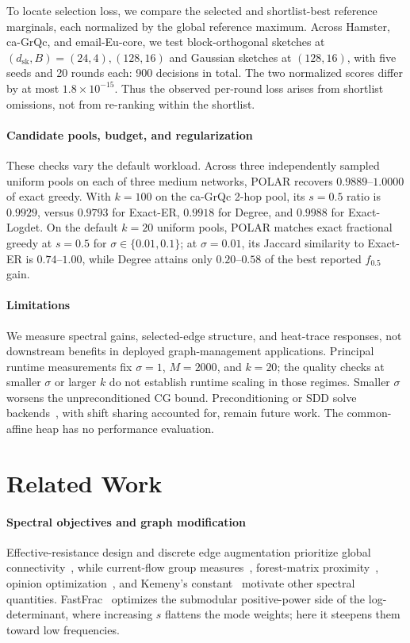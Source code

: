 \documentclass[conference]{IEEEtran}
\theoremstyle{definition}
\newcommand{\POLAR}{\textsc{POLAR}}
\newcommand{\dsk}{d_{\mathrm{sk}}}
\begin{document}
To locate selection loss, we compare the selected and shortlist-best
reference marginals, each normalized by the global reference maximum.
Across Hamster, ca-GrQc, and email-Eu-core, we test block-orthogonal
sketches at $(\dsk,B)=(24,4),(128,16)$ and Gaussian sketches at
$(128,16)$, with five seeds and 20 rounds each: 900 decisions in total.
The two normalized scores differ by at most $1.8\times10^{-15}$.
Thus the observed per-round loss arises from shortlist omissions, not
from re-ranking within the shortlist.

\paragraph{Candidate pools, budget, and regularization}
These checks vary the default workload. Across three independently sampled uniform pools on each of three
medium networks, \POLAR{} recovers $0.9889$--$1.0000$ of exact greedy.
With $k=100$ on the ca-GrQc 2-hop pool, its $s=0.5$ ratio is $0.9929$,
versus $0.9793$ for Exact-ER, $0.9918$ for Degree, and $0.9988$ for
Exact-Logdet. On the default $k=20$ uniform pools, \POLAR{} matches
exact fractional greedy at $s=0.5$ for $\sigma\in\{0.01,0.1\}$; at
$\sigma=0.01$, its Jaccard similarity to Exact-ER is $0.74$--$1.00$,
while Degree attains only $0.20$--$0.58$ of the best reported $f_{0.5}$
gain. 

\paragraph{Limitations}
We measure spectral gains, selected-edge structure, and heat-trace
responses, not downstream benefits in deployed graph-management
applications. Principal runtime
measurements fix $\sigma=1$, $M=2000$, and $k=20$; the quality
checks at smaller $\sigma$ or larger $k$ do not establish runtime
scaling in those regimes. Smaller $\sigma$ worsens the unpreconditioned
CG bound. Preconditioning or SDD solve
backends~\cite{spielman2014solver,koutis2011,kyng2016}, with shift
sharing accounted for, remain future work. The common-affine heap
has no performance evaluation.

\section{Related Work}
\label{sec:related}

\paragraph{Spectral objectives and graph modification}
Effective-resistance design and discrete edge augmentation prioritize
global connectivity~\cite{ghosh2008,predari2023}, while current-flow
group measures~\cite{li2019group,xia2025current}, forest-matrix
proximity~\cite{sun2024forest,grinten2021forest}, opinion
optimization~\cite{sun2025opinion}, and Kemeny's
constant~\cite{li2021kemeny,kirkland2025} motivate other spectral
quantities. FastFrac~\cite{fastfrac}
optimizes the submodular positive-power side of the log-determinant,
where increasing $s$ flattens the mode weights; here it steepens them
toward low frequencies.
\end{document}
